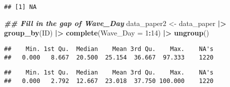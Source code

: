 \documentclass[
  12pt,
]{article}
\newenvironment{Shaded}{\begin{snugshade}}{\end{snugshade}}
\newcommand{\AttributeTok}[1]{\textcolor[rgb]{0.13,0.29,0.53}{#1}}
\newcommand{\CommentTok}[1]{\textcolor[rgb]{0.56,0.35,0.01}{\textit{#1}}}
\newcommand{\DecValTok}[1]{\textcolor[rgb]{0.00,0.00,0.81}{#1}}
\newcommand{\DocumentationTok}[1]{\textcolor[rgb]{0.56,0.35,0.01}{\textbf{\textit{#1}}}}
\newcommand{\FunctionTok}[1]{\textcolor[rgb]{0.13,0.29,0.53}{\textbf{#1}}}
\newcommand{\NormalTok}[1]{#1}
\newcommand{\OtherTok}[1]{\textcolor[rgb]{0.56,0.35,0.01}{#1}}
\newcommand{\SpecialCharTok}[1]{\textcolor[rgb]{0.81,0.36,0.00}{\textbf{#1}}}
\begin{document}
\begin{verbatim}
## [1] NA
\end{verbatim}

\begin{Shaded}
\begin{Highlighting}[]
\DocumentationTok{\#\# Fill in the gap of Wave\_Day}
\NormalTok{data\_paper2 }\OtherTok{\textless{}{-}}\NormalTok{ data\_paper }\SpecialCharTok{|\textgreater{}}
  \FunctionTok{group\_by}\NormalTok{(ID) }\SpecialCharTok{|\textgreater{}}
  \FunctionTok{complete}\NormalTok{(}\AttributeTok{Wave\_Day =} \DecValTok{1}\SpecialCharTok{:}\DecValTok{14}\NormalTok{) }\SpecialCharTok{|\textgreater{}}
  \FunctionTok{ungroup}\NormalTok{()}
\end{Highlighting}
\end{Shaded}

\begin{Shaded}
\end{Shaded}

\begin{verbatim}
##    Min. 1st Qu.  Median    Mean 3rd Qu.    Max.    NA's 
##   0.000   8.667  20.500  25.154  36.667  97.333    1220
\end{verbatim}

\begin{Shaded}
\end{Shaded}

\begin{verbatim}
##    Min. 1st Qu.  Median    Mean 3rd Qu.    Max.    NA's 
##   0.000   2.792  12.667  23.018  37.750 100.000    1220
\end{verbatim}

\begin{Shaded}
\end{Shaded}
\end{document}
